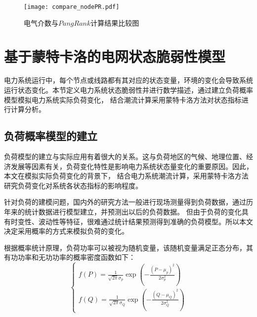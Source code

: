\begin{figure}[H] %
  \centering
  \texttt{[image: compare\_nodePR.pdf]}
  \caption{电气介数与$PangRank$计算结果比较图}
  \label{fig:compare_nodePR}
\end{figure}

\section{基于蒙特卡洛的电网状态脆弱性模型}
\label{sec:status}

电力系统运行中，每个节点或线路都有其对应的状态变量，环境的变化会导致系统运行状态变化。本节定义电力系统状态脆弱性并进行数学描述，通过建立负荷概率模型模拟电力系统实际负荷变化，
结合潮流计算采用蒙特卡洛方法对状态指标进行计算分析。
\subsection{负荷概率模型的建立}
\label{sec:vulneStaus}
负荷模型的建立与实际应用有着很大的关系。这与负荷地区的气候、地理位置、经济发展等因素有关，负荷变化特性是影响电力系统状态量变化的重要原因。因此，本文在模拟实际负荷变化的背景下，
结合电力系统潮流计算，采用蒙特卡洛方法研究负荷变化对系统各状态指标的影响程度。

针对负荷的建模问题，国内外的研究方法一般进行现场测量得到负荷数据，通过历年来的统计数据进行模型建立，并预测出以后的负荷数据\cite{refs71,refs72}。
但由于负荷的变化具有时变性、波动性等特征，很难通过统计结果预测得到准确的负荷模型。所以本文决定采用概率的方式来模拟负荷的变化。

根据概率统计原理，负荷功率可以被视为随机变量，该随机变量满足正态分布，其有功功率和无功功率的概率密度函数如下：
\begin{equation}
\label{equ:chap3:probability}
\left\{\begin{array}{l}{f(P)=\frac{1}{\sqrt{2 \pi} \sigma_{p}} \exp \left(-\frac{\left(P-\mu_{p}\right)^{2}}{2 \sigma_{p}^{2}}\right)} \\ 
{f(Q)=\frac{1}{\sqrt{2 \pi} \sigma_{Q}} \exp \left(-\frac{\left(Q-\mu_{Q}\right)^{2}}{2 \sigma_{Q}^{2}}\right)}\end{array}\right.
\end{equation}

